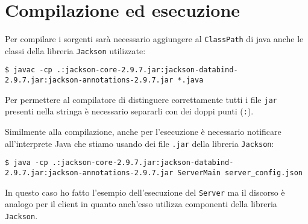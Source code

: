 \section{Compilazione ed esecuzione}
Per compilare i sorgenti sarà necessario aggiungere al \verb|ClassPath| di java anche le classi
della libreria \verb|Jackson| utilizzate:
\begin{lstlisting}
$ javac -cp .:jackson-core-2.9.7.jar:jackson-databind-2.9.7.jar:jackson-annotations-2.9.7.jar *.java
\end{lstlisting}
Per permettere al compilatore di distinguere correttamente tutti i file \verb|jar| presenti nella
stringa è necessario separarli con dei doppi punti (\verb|:|).

Similmente alla compilazione, anche per l'esecuzione è necessario notificare all'interprete Java
che stiamo usando dei file \verb|.jar| della libreria \verb|Jackson|:
\begin{lstlisting}
$ java -cp .:jackson-core-2.9.7.jar:jackson-databind-2.9.7.jar:jackson-annotations-2.9.7.jar ServerMain server_config.json
\end{lstlisting}
In questo caso ho fatto l'esempio dell'esecuzione del \verb|Server| ma il discorso è analogo per il
client in quanto anch'esso utilizza componenti della libreria \verb|Jackson|.